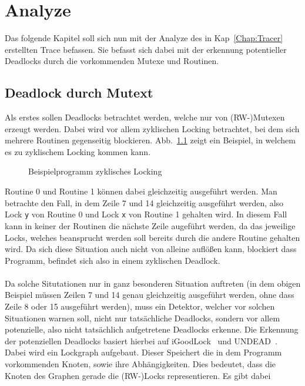\chapter{Analyze}\label{Chap:Analyze}
Das folgende Kapitel soll sich nun mit der Analyze des in Kap~\ref{Chap:Tracer} erstellten 
Trace befassen. Sie befasst sich dabei mit der erkennung potentieller Deadlocks 
durch die vorkommenden Mutexe und Routinen. 

\section{Deadlock durch Mutext}\label{Chan:Analyze-Sec:Mutex}
Als erstes sollen Deadlocks betrachtet werden, welche nur von (RW-)Mutexen erzeugt werden.
Dabei wird vor allem zyklischen Locking betrachtet, bei dem sich mehrere Routinen 
gegenseitig blockieren. 
Abb.~\ref{Chap:Analyze-Sec:Mutex-Fig:Zyclic} zeigt ein Beispiel, in welchem es zu zyklischem 
Locking kommen kann.
\begin{figure}[h!]
  
  \caption{Beispielprogramm zyklisches Locking}
  \label{Chap:Analyze-Sec:Mutex-Fig:Zyclic}
\end{figure}
Routine 0 und Routine 1 können dabei gleichzeitig ausgeführt werden. Man betrachte den Fall, in dem 
Zeile 7 und 14 gleichzeitig ausgeführt werden, also Lock \texttt{y} von Routine 0 und Lock \texttt{x} 
von Routine 1 gehalten wird. In diesem Fall kann in keiner der Routinen die nächste Zeile augeführt werden,
da das jeweilige Locks, welches beansprucht werden soll bereits durch die andere Routine gehalten wird. 
Da sich diese Situation auch nicht von alleine auflößen kann, blockiert dass Programm, befindet sich also 
in einem zyklischen Deadlock.\\\\
Da solche Situtationen nur in ganz besonderen Situation auftreten (in dem obigen Beispiel müssen Zeilen 
7 und 14 genau gleichzeitig ausgeführt werden, ohne dass Zeile 8 oder 15 ausgeführt werden), muss 
ein Detektor, welcher vor solchen Situationen warnen soll, nicht nur tatsächliche Deadlocks, sondern
vor allem potenzielle, also nicht tatsächlich aufgetretene Deadlocks erkenne. Die Erkennung der 
potenziellen Deadlocks basiert hierbei auf iGoodLock~\cite{iGoodLock} und UNDEAD~\cite{Undead}. Dabei wird ein Lockgraph 
aufgebaut. Dieser Speichert die in dem Programm vorkommenden Knoten, sowie ihre Abhängigkeiten. 
Dies bedeutet, dass die Knoten des Graphen gerade die (RW-)Locks representieren. Es gibt dabei 

